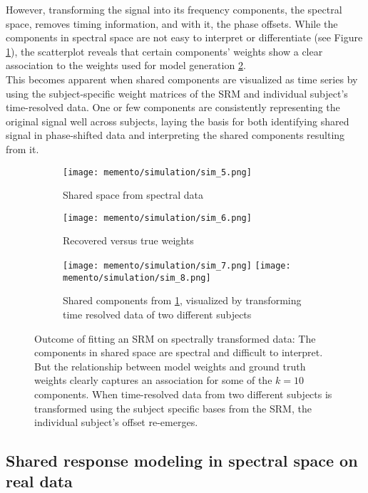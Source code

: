 However, transforming the signal into its frequency components, the spectral space, removes timing information, and with it, the phase offsets.
While the components in spectral space are not easy to interpret or differentiate (see Figure \ref{fig:sim-spectral-shared}), the scatterplot reveals that certain components' weights show a clear association to the weights used for model generation \ref{fig:sim-spectral-weights}.\\
This becomes apparent when shared components are visualized as time series by using the subject-specific weight matrices of the \gls{SRM} and individual subject's time-resolved data.
One or few components are consistently representing the original signal well across subjects, laying the basis for both identifying shared signal in phase-shifted data and interpreting the shared components resulting from it.


\begin{figure}
	\begin{subfigure}{.44\textwidth}
		\texttt{[image: memento/simulation/sim\_5.png]}
			\caption{Shared space from spectral data}
		\label{fig:sim-spectral-shared}
	\end{subfigure}
	\begin{subfigure}{0.49\textwidth}
		\texttt{[image: memento/simulation/sim\_6.png]}
			\caption{Recovered versus true weights}
		\label{fig:sim-spectral-weights}
	\end{subfigure}
	\hfill
	\begin{subfigure}{1.\textwidth}
		\texttt{[image: memento/simulation/sim\_7.png]}
		\texttt{[image: memento/simulation/sim\_8.png]}
		\caption{Shared components from \ref{fig:sim-spectral-shared}, visualized by transforming time resolved data of two different subjects}
		\label{fig:sim-spectral-transformed}
	\end{subfigure}
	\caption{Outcome of fitting an \gls{SRM} on spectrally transformed data: The components in shared space are spectral and difficult to interpret. But the relationship between model weights and ground truth weights clearly captures an association for some of the $k=10$ components. When time-resolved data from two different subjects is transformed using the subject specific bases from the \gls{SRM}, the individual subject's offset re-emerges.}
    \label{fig:sim-spectral}
\end{figure}


\subsection{Shared response modeling in spectral space on real data}


